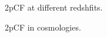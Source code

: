 \documentclass[iop]{emulateapj}
\begin{document}



\begin{figure}
   \caption{\label{fig_diffz}
  2pCF at different redshfits.
   }
\end{figure}

\begin{figure}
   \caption{\label{fig_cosmo}
   2pCF in cosmologies.
   }
\end{figure}
\end{document}
